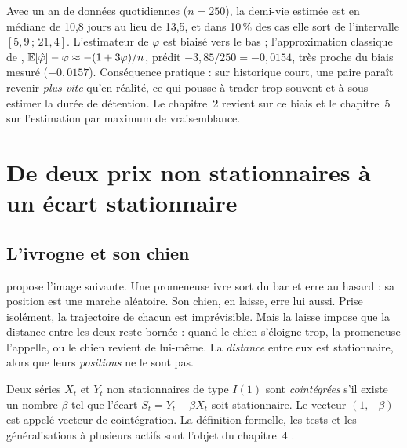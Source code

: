 \begin{pitfall}
Avec un an de données quotidiennes ($n = 250$), la demi-vie estimée est en médiane de 10,8 jours au lieu de 13,5, et dans 10\,\% des cas elle sort de l'intervalle $[5{,}9\,;\,21{,}4]$. L'estimateur de $\varphi$ est biaisé vers le bas ; l'approximation classique de \citet{kendall1954}, $\mathbb{E}[\hat\varphi]-\varphi \approx -(1+3\varphi)/n$, prédit $-3{,}85/250 = -0{,}0154$, très proche du biais mesuré ($-0{,}0157$). Conséquence pratique : sur historique court, une paire paraît revenir \emph{plus vite} qu'en réalité, ce qui pousse à trader trop souvent et à sous-estimer la durée de détention. Le chapitre~2 revient sur ce biais et le chapitre~5 sur l'estimation par maximum de vraisemblance.
\end{pitfall}

\section{De deux prix non stationnaires à un écart stationnaire}\label{c1:sec:coint}

\subsection{L'ivrogne et son chien}

\citet{murray1994} propose l'image suivante. Une promeneuse ivre sort du bar et erre au hasard : sa position est une marche aléatoire. Son chien, en laisse, erre lui aussi. Prise isolément, la trajectoire de chacun est imprévisible. Mais la laisse impose que la distance entre les deux reste bornée : quand le chien s'éloigne trop, la promeneuse l'appelle, ou le chien revient de lui-même. La \emph{distance} entre eux est stationnaire, alors que leurs \emph{positions} ne le sont pas.

\begin{definition}
Deux séries $X_t$ et $Y_t$ non stationnaires de type $I(1)$ sont \emph{cointégrées} s'il existe un nombre $\beta$ tel que l'écart $S_t = Y_t - \beta X_t$ soit stationnaire. Le vecteur $(1,-\beta)$ est appelé vecteur de cointégration. La définition formelle, les tests et les généralisations à plusieurs actifs sont l'objet du chapitre~4 \citep{englegranger1987,johansen1991}.
\end{definition}

